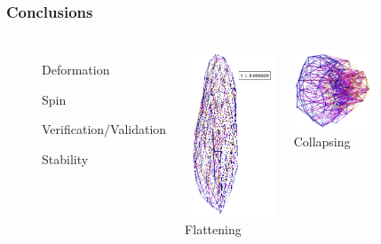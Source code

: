 \documentclass{beamer}
\begin{document}
\begin{frame}
\frametitle{Conclusions}
\begin{columns}

\begin{description}
\item[{\color{green} \checkmark}] Deformation 
\item[{\color{green}\checkmark}] Spin
\pause 
\item[{\color{red}}] Verification/Validation
\item[{\color{red}}] Stability
\end{description}

\pause
{}
\begin{center}\includegraphics[height = 0.25\textheight]{flattening}\\
\scriptsize Flattening \end{center}

\begin{center}\includegraphics[width = 0.5\textwidth]{collapsing}\\
\scriptsize Collapsing \end{center}


\end{columns}
\end{frame}
\end{document}
